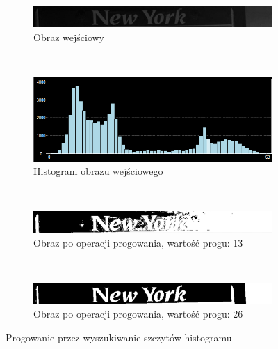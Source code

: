 \begin{figure}
  \centering
  \begin{subfigure}[b]{0.7\textwidth}
    \includegraphics[width=\textwidth]{img/histogram-peaks-input}
    \caption{Obraz wejściowy}
    \label{fig:histogram_peaks_input}
  \end{subfigure}
  ~
  \begin{subfigure}[b]{0.7\textwidth}
    \includegraphics[width=\textwidth]{img/histogram-peaks-histogram}
    \caption{Histogram obrazu wejściowego}
    \label{fig:histogram_peaks_histogram}
  \end{subfigure}
  ~
  \begin{subfigure}[b]{0.45\textwidth}
    \includegraphics[width=\textwidth]{img/histogram-peaks-bad}
    \caption{Obraz po operacji progowania, wartość progu: 13}
    \label{fig:histogram_peaks_bad}
  \end{subfigure}
  ~
  \begin{subfigure}[b]{0.45\textwidth}
    \includegraphics[width=\textwidth]{img/histogram-peaks-good}
    \caption{Obraz po operacji progowania, wartość progu: 26}
    \label{fig:hitogram_peaks_good}
  \end{subfigure}
  \caption{Progowanie przez wyszukiwanie szczytów histogramu}\label{fig:histogram_peaks}
\end{figure}

